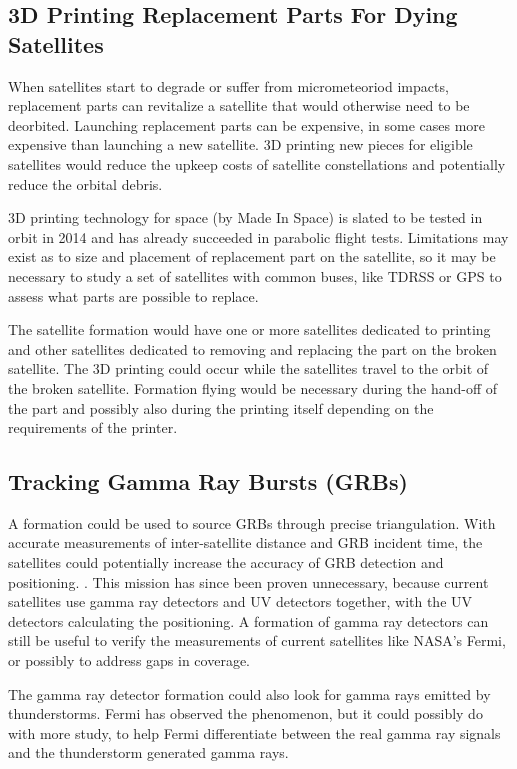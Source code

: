 \subsection{3D Printing Replacement Parts For Dying Satellites}

When satellites start to degrade or suffer from micrometeoriod impacts, replacement parts can revitalize a satellite that would otherwise need to be deorbited. Launching replacement parts can be expensive, in some cases more expensive than launching a new satellite. 3D printing new pieces for eligible satellites would reduce the upkeep costs of satellite constellations and potentially reduce the orbital debris.  

3D printing technology for space (by Made In Space) is slated to be tested in orbit in 2014 and has already succeeded in parabolic flight tests. Limitations may exist as to size and placement of replacement part on the satellite, so it may be necessary to study a set of satellites with common buses, like TDRSS or GPS to assess what parts are possible to replace. 

The satellite formation would have one or more satellites dedicated to printing and other satellites dedicated to removing and replacing the part on the broken satellite. The 3D printing could occur while the satellites travel to the orbit of the broken satellite. Formation flying would be necessary during the hand-off of the part and possibly also during the printing itself depending on the requirements of the printer. 

\subsection{Tracking Gamma Ray Bursts (GRBs)}
A formation could be used to source GRBs through precise triangulation. With accurate measurements of inter-satellite distance and GRB incident time, the satellites could potentially increase the accuracy of GRB detection and positioning. \cite{Ref:Dill}. This mission has since been proven unnecessary, because current satellites use gamma ray detectors and UV detectors together, with the UV detectors calculating the positioning. A formation of gamma ray detectors can still be useful to verify the measurements of current satellites like NASA's Fermi, or possibly to address gaps in coverage. 

The gamma ray detector formation could also look for gamma rays emitted by thunderstorms. Fermi has observed the phenomenon, but it could possibly do with more study, to help Fermi differentiate between the real gamma ray signals and the thunderstorm generated gamma rays.\cite{Ref:Fermi} \cite{Ref:Kitts}

